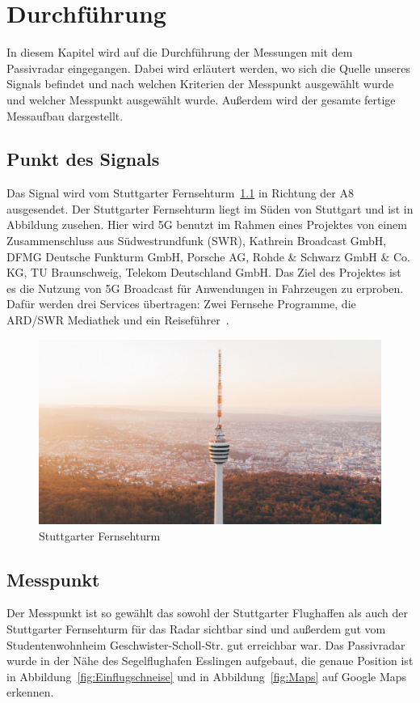 \chapter{Durchführung}
In diesem Kapitel wird auf die Durchführung der Messungen mit dem Passivradar eingegangen. Dabei wird erläutert werden, wo sich die Quelle unseres Signals befindet und nach welchen Kriterien der Messpunkt ausgewählt wurde und welcher Messpunkt ausgewählt wurde. Außerdem wird der gesamte fertige Messaufbau dargestellt.
\section{Punkt des Signals}
Das Signal wird vom Stuttgarter Fernsehturm~\ref{fig:Fernsehturm} in Richtung der A8 ausgesendet. Der Stuttgarter Fernsehturm liegt im Süden von Stuttgart und ist in Abbildung zusehen. Hier wird 5G benutzt im Rahmen eines Projektes von einem Zusammenschluss aus Südwestrundfunk (SWR), Kathrein Broadcast GmbH,  DFMG  Deutsche Funkturm GmbH, Porsche AG, Rohde \& Schwarz GmbH \& Co. KG, TU Braunschweig, Telekom Deutschland GmbH. Das Ziel des Projektes ist es die Nutzung von 5G Broadcast für Anwendungen in Fahrzeugen zu erproben. Dafür werden drei Services übertragen: Zwei Fernsehe Programme, die ARD/SWR Mediathek und ein Reiseführer~\cite{5GMAG2021}. 
\begin{figure}
    \centering
    \includegraphics[width=\textwidth]{images/Fernsehturm.jpg}
    \caption{Stuttgarter Fernsehturm}\label{fig:Fernsehturm}
\end{figure}

\section{Messpunkt}
Der Messpunkt ist so gewählt das sowohl der Stuttgarter Flughaffen als auch der Stuttgarter Fernsehturm für das Radar sichtbar sind und außerdem gut vom Studentenwohnheim Geschwister-Scholl-Str. gut erreichbar war. Das Passivradar wurde in der Nähe des Segelflughafen Esslingen aufgebaut, die genaue Position ist in Abbildung~\ref{fig:Einflugschneise} und in Abbildung~\ref{fig:Maps} auf Google Maps erkennen.

